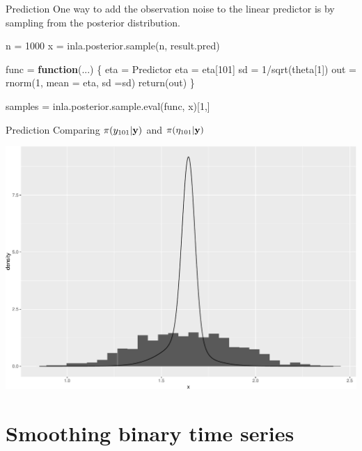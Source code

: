 \documentclass[
  ignorenonframetext,
]{beamer}
\newenvironment{Shaded}{\begin{snugshade}}{\end{snugshade}}
\newcommand{\AttributeTok}[1]{\textcolor[rgb]{0.77,0.63,0.00}{#1}}
\newcommand{\ControlFlowTok}[1]{\textcolor[rgb]{0.13,0.29,0.53}{\textbf{#1}}}
\newcommand{\DecValTok}[1]{\textcolor[rgb]{0.00,0.00,0.81}{#1}}
\newcommand{\FunctionTok}[1]{\textcolor[rgb]{0.00,0.00,0.00}{#1}}
\newcommand{\NormalTok}[1]{#1}
\newcommand{\OtherTok}[1]{\textcolor[rgb]{0.56,0.35,0.01}{#1}}
\newcommand{\SpecialCharTok}[1]{\textcolor[rgb]{0.00,0.00,0.00}{#1}}
\begin{document}
\begin{frame}[fragile]{Prediction}
\protect\hypertarget{prediction-4}{}
One way to add the observation noise to the linear predictor is by
sampling from the posterior distribution.

\small

\begin{Shaded}
\begin{Highlighting}[]
\NormalTok{n }\OtherTok{=} \DecValTok{1000}
\NormalTok{x }\OtherTok{=} \FunctionTok{inla.posterior.sample}\NormalTok{(n, result.pred)}

\NormalTok{func }\OtherTok{=} \ControlFlowTok{function}\NormalTok{(...)}
\NormalTok{\{}
\NormalTok{  eta }\OtherTok{=}\NormalTok{ Predictor}
\NormalTok{  eta }\OtherTok{=}\NormalTok{ eta[}\DecValTok{101}\NormalTok{]}
\NormalTok{  sd }\OtherTok{=} \DecValTok{1}\SpecialCharTok{/}\FunctionTok{sqrt}\NormalTok{(theta[}\DecValTok{1}\NormalTok{])}
\NormalTok{  out }\OtherTok{=} \FunctionTok{rnorm}\NormalTok{(}\DecValTok{1}\NormalTok{, }\AttributeTok{mean =}\NormalTok{ eta, }\AttributeTok{sd =}\NormalTok{sd)}
  \FunctionTok{return}\NormalTok{(out)}
\NormalTok{\}}

\NormalTok{samples }\OtherTok{=} \FunctionTok{inla.posterior.sample.eval}\NormalTok{(func, x)[}\DecValTok{1}\NormalTok{,]}
\end{Highlighting}
\end{Shaded}
\end{frame}

\begin{frame}{Prediction}
\protect\hypertarget{prediction-5}{}
Comparing \(\pi(y_{101}|\bf{y})\) and \(\pi(\eta_{101}|\bf{y})\)

\begin{center}\includegraphics[width=0.6\linewidth]{Part2_RINLA_files/figure-beamer/unnamed-chunk-37-1} \end{center}
\normalsize
\end{frame}

\hypertarget{smoothing-binary-time-series}{%
\section{Smoothing binary time
series}\label{smoothing-binary-time-series}}
\end{document}
